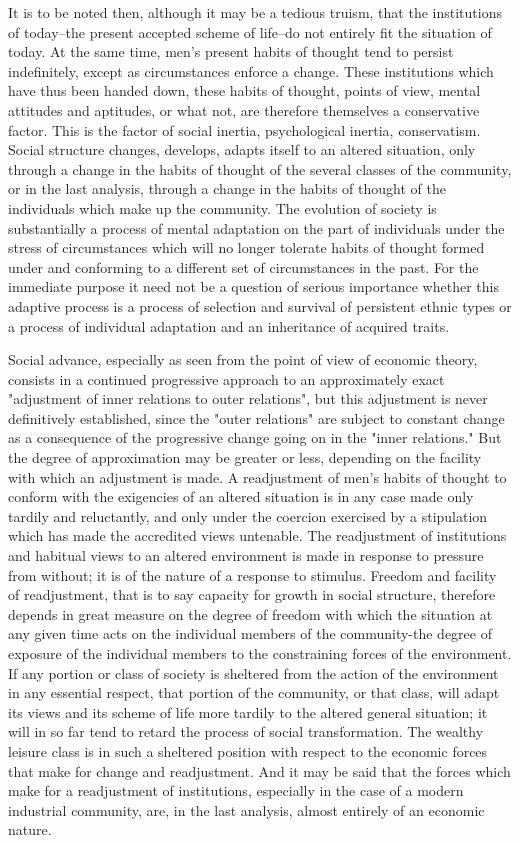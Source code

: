 \documentclass[12pt]{report}
\begin{document}
It is to be noted then, although it may be a tedious truism, that the
institutions of today--the present accepted scheme of life--do not
entirely fit the situation of today. At the same time, men's present
habits of thought tend to persist indefinitely, except as circumstances
enforce a change. These institutions which have thus been handed down,
these habits of thought, points of view, mental attitudes and aptitudes,
or what not, are therefore themselves a conservative factor. This is the
factor of social inertia, psychological inertia, conservatism. Social
structure changes, develops, adapts itself to an altered situation, only
through a change in the habits of thought of the several classes of the
community, or in the last analysis, through a change in the habits of
thought of the individuals which make up the community. The evolution of
society is substantially a process of mental adaptation on the part
of individuals under the stress of circumstances which will no longer
tolerate habits of thought formed under and conforming to a different
set of circumstances in the past. For the immediate purpose it need not
be a question of serious importance whether this adaptive process is
a process of selection and survival of persistent ethnic types or a
process of individual adaptation and an inheritance of acquired traits.

Social advance, especially as seen from the point of view of economic
theory, consists in a continued progressive approach to an approximately
exact "adjustment of inner relations to outer relations", but this
adjustment is never definitively established, since the "outer
relations" are subject to constant change as a consequence of the
progressive change going on in the "inner relations." But the degree
of approximation may be greater or less, depending on the facility with
which an adjustment is made. A readjustment of men's habits of thought
to conform with the exigencies of an altered situation is in any case
made only tardily and reluctantly, and only under the coercion exercised
by a stipulation which has made the accredited views untenable.
The readjustment of institutions and habitual views to an altered
environment is made in response to pressure from without; it is of the
nature of a response to stimulus. Freedom and facility of readjustment,
that is to say capacity for growth in social structure, therefore
depends in great measure on the degree of freedom with which the
situation at any given time acts on the individual members of the
community-the degree of exposure of the individual members to the
constraining forces of the environment. If any portion or class of
society is sheltered from the action of the environment in any essential
respect, that portion of the community, or that class, will adapt
its views and its scheme of life more tardily to the altered general
situation; it will in so far tend to retard the process of social
transformation. The wealthy leisure class is in such a sheltered
position with respect to the economic forces that make for change
and readjustment. And it may be said that the forces which make for
a readjustment of institutions, especially in the case of a modern
industrial community, are, in the last analysis, almost entirely of an
economic nature.
\end{document}
